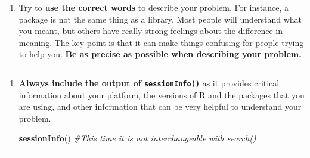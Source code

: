 \documentclass[
]{article}
\newenvironment{Shaded}{\begin{snugshade}}{\end{snugshade}}
\newcommand{\CommentTok}[1]{\textcolor[rgb]{0.56,0.35,0.01}{\textit{#1}}}
\newcommand{\KeywordTok}[1]{\textcolor[rgb]{0.13,0.29,0.53}{\textbf{#1}}}
\newcommand{\NormalTok}[1]{#1}
\providecommand{\tightlist}{%
  \setlength{\itemsep}{0pt}\setlength{\parskip}{0pt}}
\begin{document}
\begin{enumerate}
\def\labelenumi{\arabic{enumi}.}
\tightlist
\item
  Try to \textbf{use the correct words} to describe your problem. For
  instance, a package is not the same thing as a library. Most people
  will understand what you meant, but others have really strong feelings
  about the difference in meaning. The key point is that it can make
  things confusing for people trying to help you. \textbf{Be as precise
  as possible when describing your problem.}
\end{enumerate}

\begin{center}\rule{0.5\linewidth}{0.5pt}\end{center}

\begin{enumerate}
\def\labelenumi{\arabic{enumi}.}
\setcounter{enumi}{1}
\item
  \textbf{Always include the output of \texttt{sessionInfo()}} as it
  provides critical information about your platform, the versions of R
  and the packages that you are using, and other information that can be
  very helpful to understand your problem.

\begin{Shaded}
\begin{Highlighting}[]
\KeywordTok{sessionInfo}\NormalTok{()  }\CommentTok{#This time it is not interchangeable with search()}
\end{Highlighting}
\end{Shaded}
\end{enumerate}

\begin{center}\rule{0.5\linewidth}{0.5pt}\end{center}
\end{document}
